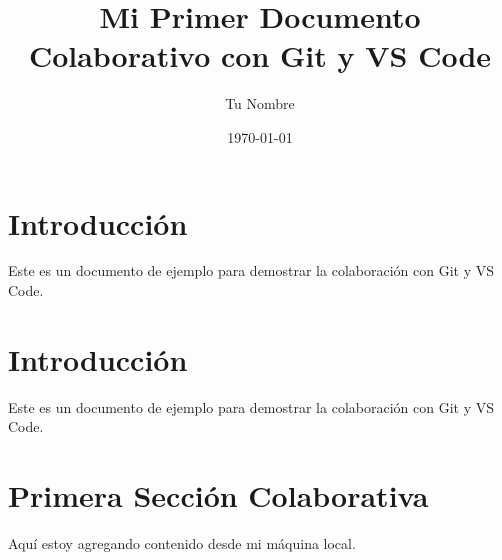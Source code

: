 \documentclass{article}
\title{Mi Primer Documento Colaborativo con Git y VS Code}
\author{Tu Nombre}
\date{\today}
\begin{document}
\maketitle

\section{Introducción}
Este es un documento de ejemplo para demostrar la colaboración con Git y VS Code.

\section{Introducción}
Este es un documento de ejemplo para demostrar la colaboración con Git y VS Code.

\section{Primera Sección Colaborativa}
Aquí estoy agregando contenido desde mi máquina local.
\end{document}
